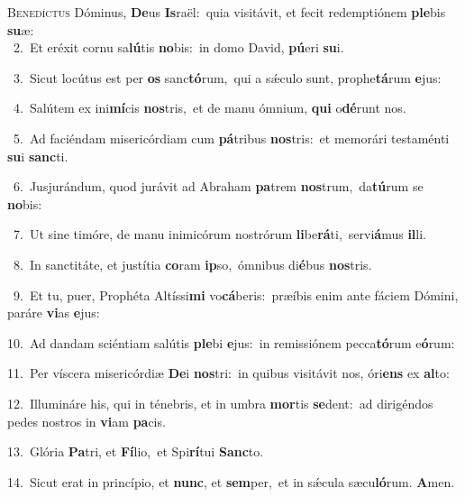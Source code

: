 \lettrine{\initial\textcolor{\initialcolor}{B}}{enedíctus} Dóminus, \textbf{De}\-us \textbf{Is}\-raël:~\star quia visitávit, et fecit redemptiónem \textbf{ple}\-bis \textbf{su}\-æ:\\
{\numbfont\textcolor{\numbcolor}{~2.}}~Et eréxit cornu sa\-\textbf{lú}\-tis \textbf{no}\-bis:~\star in domo David, \textbf{pú}\-eri \textbf{su}\-i.\par
{\numbfont\textcolor{\numbcolor}{~3.}}~Sicut locútus est per \textbf{os} sanc\-\textbf{tó}\-rum,~\star qui a sǽculo sunt, prophe\-\textbf{tá}\-rum \textbf{e}\-jus:\par
{\numbfont\textcolor{\numbcolor}{~4.}}~Salútem ex ini\-\textbf{mí}\-cis \textbf{nos}\-tris,~\star et de manu ómnium, \textbf{qui} o\-\textbf{dé}\-runt nos.\par
{\numbfont\textcolor{\numbcolor}{~5.}}~Ad faciéndam misericórdiam cum \textbf{pá}\-tribus \textbf{nos}\-tris:~\star et memorári testaménti \textbf{su}\-i \textbf{sanc}\-ti.\par
{\numbfont\textcolor{\numbcolor}{~6.}}~Jusjurándum, quod jurávit ad Abraham \textbf{pa}\-trem \textbf{nos}\-trum,~\star da\-\textbf{tú}\-rum se \textbf{no}\-bis:\par
{\numbfont\textcolor{\numbcolor}{~7.}}~Ut sine timóre, de manu inimicórum nostrórum \textbf{li}\-be\-\textbf{rá}\-ti,~\star servi\-\textbf{á}\-mus \textbf{il}\-li.\par
{\numbfont\textcolor{\numbcolor}{~8.}}~In sanctitáte, et justítia \textbf{co}\-ram \textbf{ip}\-so,~\star ómnibus di\-\textbf{é}\-bus \textbf{nos}\-tris.\par
{\numbfont\textcolor{\numbcolor}{~9.}}~Et tu, puer, Prophéta Altíssi\textbf{mi} vo\-\textbf{cá}\-beris:~\star præíbis enim ante fáciem Dómini, paráre \textbf{vi}\-as \textbf{e}\-jus:\par
{\numbfont\textcolor{\numbcolor}{10.}}~Ad dandam sciéntiam salútis \textbf{ple}\-bi \textbf{e}\-jus:~\star in remissiónem pecca\-\textbf{tó}\-rum e\-\textbf{ó}\-rum:\par
{\numbfont\textcolor{\numbcolor}{11.}}~Per víscera misericórdiæ \textbf{De}\-i \textbf{nos}\-tri:~\star in quibus visitávit nos, óri\textbf{ens} ex \textbf{al}\-to:\par
{\numbfont\textcolor{\numbcolor}{12.}}~Illumináre his, qui in ténebris, et in umbra \textbf{mor}\-tis \textbf{se}\-dent:~\star ad dirigéndos pedes nostros in \textbf{vi}\-am \textbf{pa}\-cis.\par
{\numbfont\textcolor{\numbcolor}{13.}}~Glória \textbf{Pa}\-tri, et \textbf{Fí}\-lio,~\star et Spi\-\textbf{rí}\-tui \textbf{Sanc}\-to.\par
{\numbfont\textcolor{\numbcolor}{14.}}~Sicut erat in princípio, et \textbf{nunc}\-, et \textbf{sem}\-per,~\star et in sǽcula sæcu\-\textbf{ló}\-rum. \textbf{A}\-men.\par
